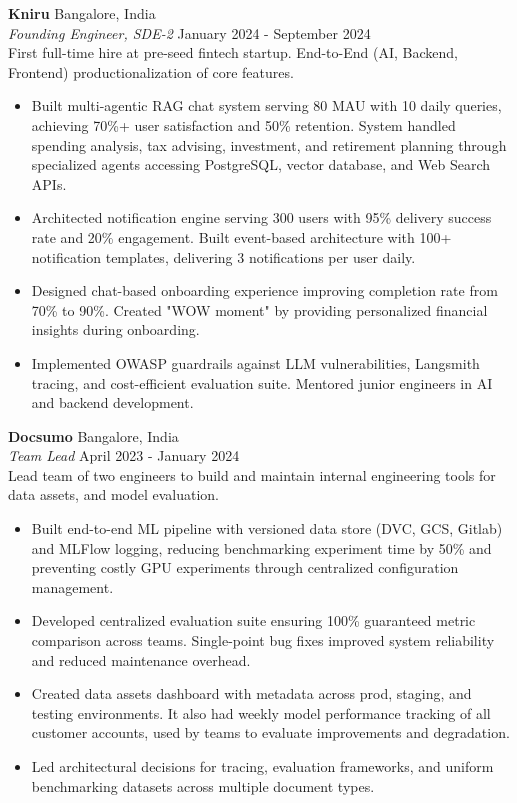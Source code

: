 \documentclass[a4paper]{article}
\begin{document}
\textbf{Kniru} \hfill Bangalore, India\\
\textit{Founding Engineer, SDE-2} \hfill January 2024 - September 2024\\
{First full-time hire at pre-seed fintech startup. End-to-End (AI, Backend, Frontend) productionalization of core features.}
\vspace{-1mm}
\begin{itemize} \itemsep 0pt
	\item Built multi-agentic RAG chat system serving 80 MAU with 10 daily queries, achieving 70\%+ user satisfaction and 50\% retention. System handled spending analysis, tax advising, investment, and retirement planning through specialized agents accessing PostgreSQL, vector database, and Web Search APIs.
	\item Architected notification engine serving 300 users with 95\% delivery success rate and 20\% engagement. Built event-based architecture with 100+ notification templates, delivering 3 notifications per user daily.
	\item Designed chat-based onboarding experience improving completion rate from 70\% to 90\%. Created "WOW moment" by providing personalized financial insights during onboarding.
	\item Implemented OWASP guardrails against LLM vulnerabilities, Langsmith tracing, and cost-efficient evaluation suite. Mentored junior engineers in AI and backend development.
\end{itemize}

\textbf{Docsumo} \hfill Bangalore, India\\
\textit{Team Lead} \hfill April 2023 - January 2024\\
{Lead team of two engineers to build and maintain internal engineering tools for data assets, and model evaluation.}
\vspace{-1mm}
\begin{itemize} \itemsep 0pt
	\item Built end-to-end ML pipeline with versioned data store (DVC, GCS, Gitlab) and MLFlow logging, reducing benchmarking experiment time by 50\% and preventing costly GPU experiments through centralized configuration management.
	\item Developed centralized evaluation suite ensuring 100\% guaranteed metric comparison across teams. Single-point bug fixes improved system reliability and reduced maintenance overhead.
	\item Created data assets dashboard with metadata across prod, staging, and testing environments. It also had weekly model performance tracking of all customer accounts, used by teams to evaluate improvements and degradation.
	\item Led architectural decisions for tracing, evaluation frameworks, and uniform benchmarking datasets across multiple document types.
\end{itemize}
\end{document}
